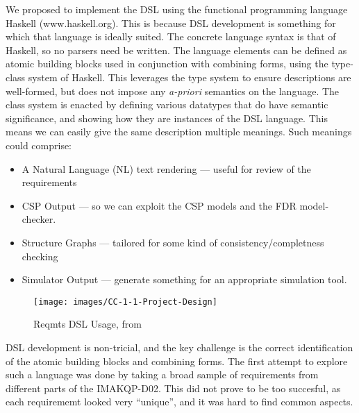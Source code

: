 We proposed to implement the DSL using the functional programming language
Haskell (www.haskell.org).
This is because DSL development is something for which that language is ideally suited.
The concrete language syntax is that of Haskell,
so no parsers need be written.
The language elements can be defined as atomic building blocks
used in conjunction with combining forms, using the type-class system
of Haskell.
This leverages the type system to ensure descriptions are well-formed,
but does not impose any \emph{a-priori} semantics on the language.
The class system is enacted by defining various
datatypes that do have semantic significance,
and showing how they are instances of the DSL language.
This means we can easily give the same description multiple meanings.
Such meanings could comprise:
\begin{itemize}
  \item A Natural Language (NL) text rendering --- useful for review of the requirements
  \item CSP Output --- so we can exploit the CSP models and the FDR model-checker.
  \item Structure Graphs --- tailored for some kind of consistency/completness checking
  \item Simulator Output --- generate something for an appropriate simulation tool.
\end{itemize}
\begin{figure}
\texttt{[image: images/CC-1-1-Project-Design]}
  \caption{Reqmts DSL Usage, from \cite{Costelloe17}}
\end{figure}
DSL development is non-tricial,
and the key challenge is the correct identification
of the atomic building blocks and combining forms.
The first attempt to explore such a language was done by taking a broad
sample of requirements from different parts of the IMAKQP-D02.
This did not prove to be too succesful,
as each requirememt looked very ``unique'',
and it was hard to find common aspects.

